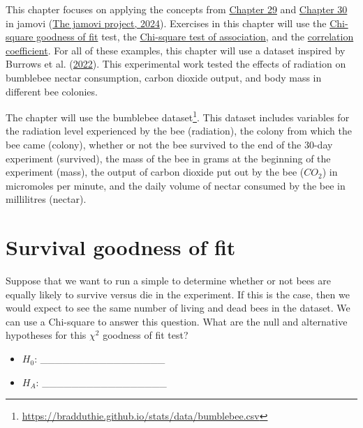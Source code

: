 \documentclass[
  openany]{krantz}
\begin{document}
This chapter focuses on applying the concepts from \protect\hyperlink{Chapter_29}{Chapter 29} and \protect\hyperlink{Chapter_30}{Chapter 30} in jamovi (\protect\hyperlink{ref-Jamovi2022}{The jamovi project, 2024}).
Exercises in this chapter will use the \protect\hyperlink{chi-squared-goodness-of-fit}{Chi-square goodness of fit} test, the \protect\hyperlink{chi-squared-test-of-association}{Chi-square test of association},
and the \protect\hyperlink{correlation-hypothesis-testing}{correlation coefficient}.
For all of these examples, this chapter will use a dataset inspired by Burrows et al. (\protect\hyperlink{ref-Burrows2022}{2022}).
This experimental work tested the effects of radiation on bumblebee nectar consumption, carbon dioxide output, and body mass in different bee colonies.

The chapter will use the bumblebee dataset\footnote{\url{https://bradduthie.github.io/stats/data/bumblebee.csv}}.
This dataset includes variables for the radiation level experienced by the bee (radiation), the colony from which the bee came (colony), whether or not the bee survived to the end of the 30-day experiment (survived), the mass of the bee in grams at the beginning of the experiment (mass), the output of carbon dioxide put out by the bee (\(CO_2\)) in micromoles per minute, and the daily volume of nectar consumed by the bee in millilitres (nectar).

\hypertarget{survival-goodness-of-fit}{%
\section{Survival goodness of fit}\label{survival-goodness-of-fit}}

Suppose that we want to run a simple  to determine whether or not bees are equally likely to survive versus die in the experiment.
If this is the case, then we would expect to see the same number of living and dead bees in the dataset.
We can use a Chi-square  to answer this question.
What are the null and alternative hypotheses for this \(\chi^{2}\) goodness of fit test?

\begin{itemize}
\item
  \(H_{0}\): \_\_\_\_\_\_\_\_\_\_\_\_\_\_\_\_\_
\item
  \(H_{A}\): \_\_\_\_\_\_\_\_\_\_\_\_\_\_\_\_\_
\end{itemize}
\end{document}
